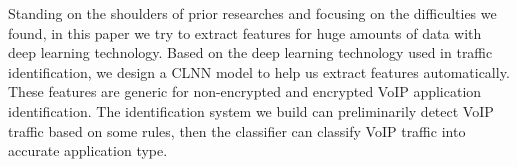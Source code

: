 \documentclass[conference]{IEEEtran}
\begin{document}



Standing on the shoulders of prior researches and focusing on the difficulties we found, in this paper we try to extract features for huge amounts of data with deep learning technology. Based on the deep learning technology used in traffic identification\cite{1,wang2017end}, we design a CLNN model to help us extract features automatically. These features are generic for non-encrypted and encrypted VoIP application identification. The identification system we build can preliminarily detect VoIP traffic based on some rules, then the classifier can classify VoIP traffic into accurate application type. 
\end{document}
